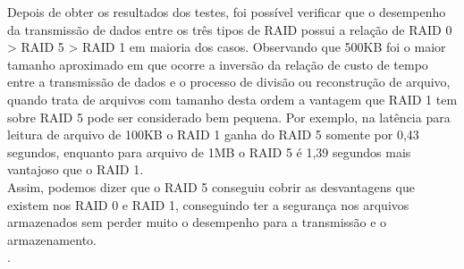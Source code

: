 	Depois de obter os resultados dos testes, foi possível verificar que o desempenho da transmissão de dados entre os três tipos de RAID possui a relação de RAID 0 > RAID 5 > RAID 1 em maioria dos casos. Observando que 500KB foi o maior tamanho aproximado em que ocorre a inversão da relação de custo de tempo entre a transmissão de dados e o processo de divisão ou reconstrução de arquivo, quando trata de arquivos com tamanho desta ordem a vantagem que RAID 1 tem sobre RAID 5 pode ser considerado bem pequena. 
	Por exemplo, na latência para leitura de arquivo de 100KB o RAID 1 ganha do RAID 5 somente por 0,43 segundos, enquanto para arquivo de 1MB o RAID 5 é 1,39 segundos mais vantajoso que o RAID 1.
	\\
	
	Assim, podemos dizer que o RAID 5 conseguiu cobrir as desvantagens que existem nos RAID 0 e RAID 1, conseguindo ter a segurança nos arquivos armazenados sem perder muito o desempenho para a transmissão e o armazenamento.
	\\
	
	
	
	
	
	
	
	
	
	
	
	.
	